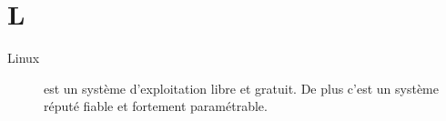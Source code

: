 \section{L}

\begin{description}

\item[Linux] est un système d'exploitation libre et gratuit. De plus c'est un système 
réputé fiable et fortement paramétrable.

\end{description}
